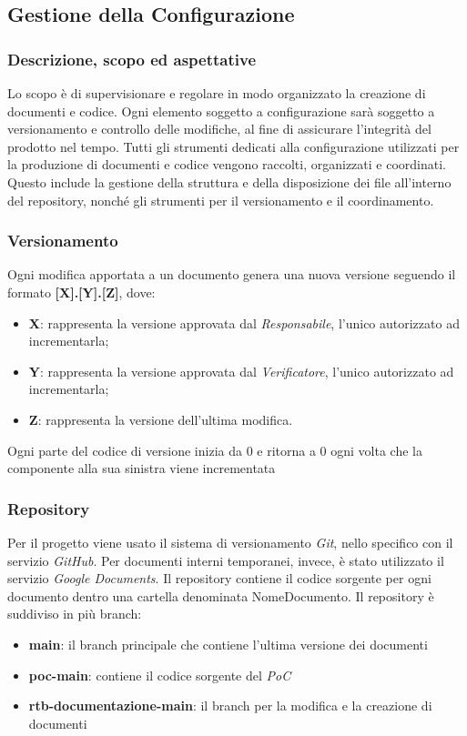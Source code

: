 \subsection{Gestione della Configurazione}

\subsubsection{Descrizione, scopo ed aspettative}
    Lo scopo è di supervisionare e regolare in modo organizzato la creazione di 
    documenti e codice. Ogni elemento soggetto a configurazione sarà soggetto a versionamento
    e controllo delle modifiche, al fine di assicurare l'integrità del prodotto 
    nel tempo.
    Tutti gli strumenti dedicati alla configurazione utilizzati per la produzione
    di documenti e codice vengono raccolti, organizzati e coordinati. Questo include
    la gestione della struttura e della disposizione dei file all'interno del repository, 
    nonché gli strumenti per il versionamento e il coordinamento.

\subsubsection{Versionamento}
Ogni modifica apportata a un documento genera una nuova versione seguendo il formato
\textbf{[X].[Y].[Z]}, dove:
\begin{itemize}
    \item \textbf{X}: rappresenta la versione approvata dal \emph{Responsabile}, l'unico autorizzato ad incrementarla;
    \item \textbf{Y}: rappresenta la versione approvata dal \emph{Verificatore}, l'unico autorizzato ad incrementarla;
    \item \textbf{Z}: rappresenta la versione dell'ultima modifica.
\end{itemize}
Ogni parte del codice di versione inizia da 0 e ritorna a 0 ogni volta che la componente alla sua sinistra
viene incrementata
\subsubsection{Repository}
    Per il progetto viene usato il sistema di versionamento \emph{Git}, nello specifico con 
    il servizio \emph{GitHub}. Per documenti interni temporanei, invece, è stato utilizzato il servizio 
    \emph{Google Documents}.
    Il repository contiene il codice sorgente per ogni documento dentro una cartella denominata
    NomeDocumento. Il repository è suddiviso in più branch:
    \begin{itemize}
        \item \textbf{main}: il branch principale che contiene l'ultima versione dei documenti
        \item \textbf{poc-main}: contiene il codice sorgente del \emph{PoC}
        \item \textbf{rtb-documentazione-main}: il branch per la modifica e la creazione di documenti
    \end{itemize}
    